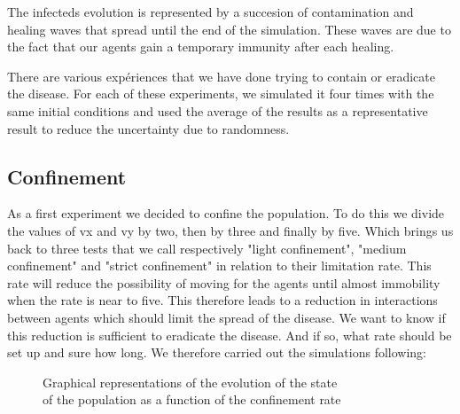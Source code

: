 \documentclass[a4paper, 12pt]{report}
\begin{document}
\newpage

The infecteds evolution is represented by a succesion of contamination and healing waves that spread until the end of the simulation. These waves are due to the fact that our agents
gain a temporary immunity after each healing.

\vspace{0.8cm}

There are various expériences that we have done trying to contain or eradicate the disease. For each of these experiments, we simulated it four times with the same initial conditions
and used the average of the results as a representative result to reduce the uncertainty due to randomness.


\subsection{Confinement}

As a first experiment we decided to confine the population. To do this we divide the
values of vx and vy by two, then by three and finally by five. Which brings us back to three tests that we
call respectively "light confinement", "medium confinement" and "strict confinement" in relation to their
limitation rate. This rate will reduce the possibility of moving for the agents until almost immobility
when the rate is near to five. This therefore leads to a reduction in interactions between agents which should
limit the spread of the disease. We want to know if this reduction is sufficient to eradicate the disease. And
if so, what rate should be set up and sure how long. We therefore carried out the simulations
following:

\begin{figure}[h]
	\centering
	\qquad
\end{figure}
\begin{figure}[h]
	\centering
	\qquad
	\caption{Graphical representations of the evolution of the state \\ of the population as a function of the confinement rate}
\end{figure}
\newpage
\end{document}
